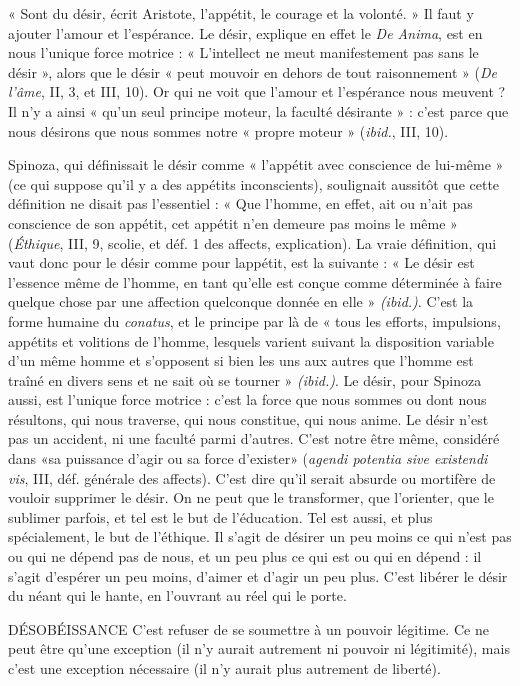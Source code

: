 « Sont du désir, écrit Aristote, l’appétit, le courage et la volonté. » Il faut y
ajouter l'amour et l’espérance. Le désir, explique en effet le {\it De Anima}, est en
nous l’unique force motrice : « L’intellect ne meut manifestement pas sans le
désir », alors que le désir « peut mouvoir en dehors de tout raisonnement » ({\it De
l'âme}, II, 3, et III, 10). Or qui ne voit que l’amour et l'espérance nous
meuvent ? Il n’y a ainsi « qu’un seul principe moteur, la faculté désirante » :
c’est parce que nous désirons que nous sommes notre « propre moteur » ({\it ibid.},
III, 10).

Spinoza, qui définissait le désir comme « l’appétit avec conscience de lui-même »
(ce qui suppose qu’il y a des appétits inconscients), soulignait aussitôt
que cette définition ne disait pas l’essentiel : « Que l’homme, en effet, ait ou
n'ait pas conscience de son appétit, cet appétit n’en demeure pas moins le
même » ({\it Éthique}, III, 9, scolie, et déf. 1 des affects, explication). La vraie définition,
qui vaut donc pour le désir comme pour lappétit, est la suivante : « Le
désir est l’essence même de l’homme, en tant qu’elle est conçue comme déterminée
à faire quelque chose par une affection quelconque donnée en elle »
{\it (ibid.)}. C’est la forme humaine du {\it conatus}, et le principe par là de « tous les
efforts, impulsions, appétits et volitions de l’homme, lesquels varient suivant la
disposition variable d’un même homme et s’opposent si bien les uns aux autres
que l’homme est traîné en divers sens et ne sait où se tourner » {\it (ibid.)}. Le désir,
pour Spinoza aussi, est l’unique force motrice : c’est la force que nous sommes
ou dont nous résultons, qui nous traverse, qui nous constitue, qui nous anime.
Le désir n’est pas un accident, ni une faculté parmi d’autres. C’est notre être
même, considéré dans «sa puissance d’agir ou sa force d'exister» ({\it agendi
potentia sive existendi vis}, III, déf. générale des affects). C’est dire qu'il serait
absurde ou mortifère de vouloir supprimer le désir. On ne peut que le transformer,
que l’orienter, que le sublimer parfois, et tel est le but de l’éducation.
Tel est aussi, et plus spécialement, le but de l’éthique. Il s’agit de désirer un peu
moins ce qui n’est pas ou qui ne dépend pas de nous, et un peu plus ce qui est
ou qui en dépend : il s’agit d’espérer un peu moins, d’aimer et d’agir un peu
plus. C’est libérer le désir du néant qui le hante, en l’ouvrant au réel qui le
porte.

DÉSOBÉISSANCE C’est refuser de se soumettre à un pouvoir légitime. Ce
ne peut être qu’une exception (il n’y aurait autrement
ni pouvoir ni légitimité), mais c’est une exception nécessaire (il n’y aurait plus
autrement de liberté).

